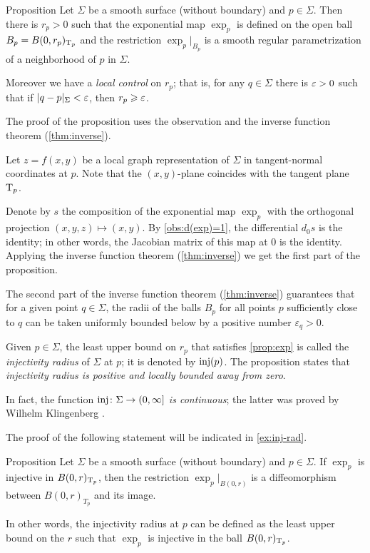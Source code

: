 \begin{thm}{Proposition}\label{prop:exp}
Let $\Sigma$ be a smooth surface (without boundary) and $p\in \Sigma$.
Then there is $r_p>0$ such that
the exponential map $\exp_p$ is defined on the open ball $B_p=B(0,r_p)_{\mathrm{T}_p}$
and the restriction $\exp_p|_{B_p}$ is a smooth regular parametrization of a neighborhood of $p$ in $\Sigma$.

Moreover we have a {}\emph{local control} on $r_p$;
that is, for any $q\in \Sigma$ there is $\varepsilon>0$ such that if $|q-p|_\Sigma<\varepsilon$, then $r_p\geqslant\varepsilon$.
\end{thm}

The proof of the proposition uses the observation and the inverse function theorem (\ref{thm:inverse}).

Let $z=f(x,y)$ be a local graph representation of $\Sigma$ in  tangent-normal coordinates at $p$.
Note that the $(x,y)$-plane coincides with the tangent plane $\mathrm{T}_p$.

Denote by $s$ the composition of  the exponential map $\exp_p$ with the orthogonal projection $(x,y,z)\mapsto (x,y)$.
By \ref{obs:d(exp)=1}, the differential $d_0s$ is the identity;
in other words, the Jacobian matrix of this map at $0$ is the identity.
Applying the inverse function theorem (\ref{thm:inverse}) we get the first part of the proposition.

The second part of the inverse function theorem (\ref{thm:inverse}) 
 guarantees that for a given point $q\in \Sigma$, the radii of the balls $B_p$
   for all points $p$ sufficiently close to $q$
    can be taken uniformly 
  bounded below by a positive number $\varepsilon_q >0$.
\qeds

Given $p\in \Sigma$, the least upper bound on $r_p$ that satisfies \ref{prop:exp} is called the \emph{injectivity radius} of $\Sigma$ at $p$;
it is denoted by $\mathop{\rm inj}\nolimits(p)$.
The proposition states that {}\emph{injectivity radius is positive and locally bounded away from zero}.

In fact, the function {}\emph{$\mathop{\rm inj}\nolimits\colon\Sigma\to (0,\infty]$ is continuous};
the latter was proved by Wilhelm Klingenberg \cite[5.4]{gromoll-klingenberg-meyer}. 

The proof of the following statement will be indicated in \ref{ex:inj-rad}.

\begin{thm}{Proposition}\label{prop:inj-rad}
Let $\Sigma$ be a smooth surface (without boundary) and $p\in \Sigma$.
If $\exp_p$ is injective in $B(0,r)_{\mathrm{T}_p}$, then the restriction $\exp_p|_{B(0,r)}$ is a diffeomorphism between $B(0,r)_{T_p}$ and its image.

In other words, the injectivity radius at $p$ can be defined as the least upper bound on the $r$ such that $\exp_p$ is injective in the ball $B(0,r)_{\mathrm{T}_p}$.
\end{thm}

